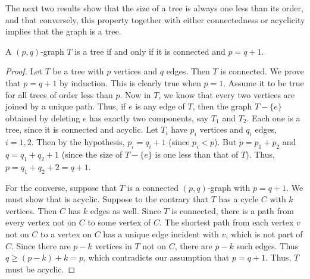 The next two results show that the size of a tree is always one less than its order, and that conversely, this property together with either connectedness or acyclicity implies that the graph is a tree.
\begin{Theorem}\label{thm:Conn;p=q+1}
A $(p, q)$-graph $T$ is a tree if and only if it is connected and $p = q + 1$.
\end{Theorem}
\begin{proof}
Let $T$ be a tree with $p$ vertices and $q$ edges. Then $T$ is connected. We prove that $p = q + 1$ by induction. This is clearly true when $p = 1$. Assume it to be true for all trees of order less than $p$. Now in $T$, we know that every two vertices are joined by a unique path. Thus, if $e$ is any edge of $T$, then the graph $T - \{e\}$ obtained by deleting $e$ has exactly two components, say $T_1$ and $T_2$. Each one is a tree, since it is connected and acyclic. Let $T_i$ have $p_i$ vertices and $q_i$ edges, $i = 1, 2$. Then by the hypothesis, $p_i = q_i + 1$ (since $p_i < p$). But $p = p_1 + p_2$ and $q = q_1 + q_2 + 1$ (since the size of $T - \{e\}$ is one less than that of $T$). Thus, $p = q_1 + q_2 + 2 = q + 1$.

For the converse, suppose that $T$ is a connected $(p,q)$-graph with $p = q + 1$. We must show that is acyclic. Suppose to the contrary that $T$ has a cycle $C$ with $k$ vertices. Then $C$ has $k$ edges as well. Since $T$ is connected, there is a path from every vertex not on $C$ to some vertex of $C$. The shortest path from each vertex $v$ not on $C$ to a vertex on $C$ has a unique edge incident with $v$, which is not part of $C$. Since there are $p - k$ vertices in $T$ not on $C$, there are $p - k$ such edges. Thus $q \ge (p - k) + k = p$, which contradicts our assumption that $p = q + 1$. Thus, $T$ must be acyclic.
\end{proof}


